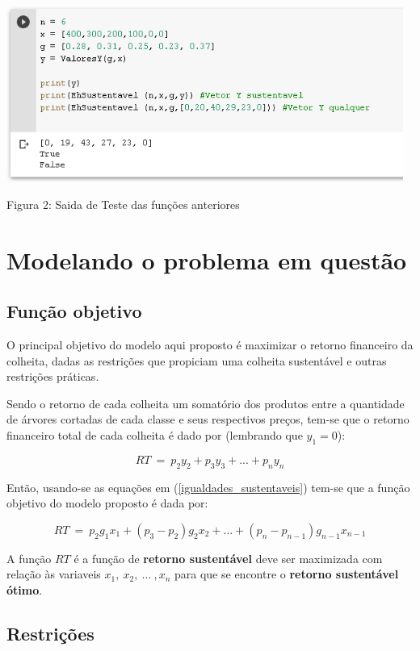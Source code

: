 \documentclass[a4paper, 12pt]{article}
\begin{document}
\begin{center}
    \includegraphics[width=13cm]{SaidaPrg.PNG}
    
    Figura 2: Saida de Teste das funções anteriores
\end{center}


\section{Modelando o problema em questão}
\subsection{Função objetivo}
O principal objetivo do modelo aqui proposto é maximizar o retorno financeiro da colheita, dadas as restrições que propiciam uma colheita sustentável e outras restrições práticas.

Sendo o retorno de cada colheita um somatório dos produtos entre a quantidade de árvores cortadas de cada classe e seus respectivos preços, tem-se que o retorno financeiro total de cada colheita é dado por (lembrando que $y_1=0$):

$$RT\ =\ p_2y_2+p_3y_3+...+p_ny_n$$

Então, usando-se as equações em (\ref{igualdades_sustentaveis}) tem-se que a função objetivo do modelo proposto é dada por:

\begin{equation}\label{funcao_objetivo}
    RT\ =\ p_2g_1x_1+\left(p_3-p_2\right)g_2x_2+...+\left(p_n-p_{n-1}\right)g_{n-1}x_{n-1}
\end{equation}

A função $RT$ é a função de \textbf{retorno sustentável} deve ser maximizada com relação às variaveis $x_1{,}\ x_2{,}\ ...\ {,}x_n$ para que se encontre o \textbf{retorno sustentável ótimo}.

\subsection{Restrições}
\end{document}
